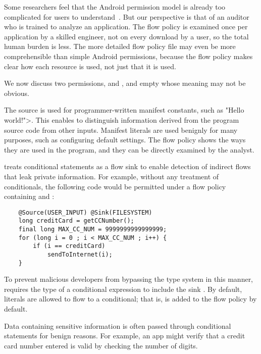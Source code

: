 Some researchers feel that the Android permission model is already too complicated for
users to understand~\cite{felt:2011:permissions}.  But our perspective is that of an auditor who
is trained to analyze an application.  The flow policy is examined once
per application by a skilled engineer, not on every download by a user, so
the total human burden is less.  The more detailed flow
policy file may even be more comprehensible than simple Android permissions,
because the flow policy makes clear how each resource is used, not just
that it is used.



We now discuss two permissions,  and , and empty  whose meaning may not be obvious.

The  source is used for programmer-written manifest
constants, such as \<"Hello world!">.
This enables \theFlowChecker to distinguish information derived
from the program source code from other inputs.
Manifest literals are used benignly for many 
purposes, such as configuring default settings.
The flow policy shows the ways they are used in the program, and they can
be directly examined by the analyst.


\TheFlowChecker treats conditional statements as a flow sink
to enable detection of indirect flows that leak private information.
For example, without any treatment of conditionals, the following code would
be permitted under a flow policy containing  and :

\begin{Verbatim}
    @Source(USER_INPUT) @Sink(FILESYSTEM)
    long creditCard = getCCNumber();
    final long MAX_CC_NUM = 9999999999999999;
    for (long i = 0 ; i < MAX_CC_NUM ; i++) {
        if (i == creditCard)
            sendToInternet(i);
    }
\end{Verbatim}

To prevent malicious developers from bypassing the type system in this manner,
\theFlowChecker requires the type of a
conditional expression to include the sink .
By default, literals are allowed to flow
to a conditional; that is,  is added to the flow policy by default.

Data containing sensitive information is often passed through conditional statements for benign reasons.  
For example, an app might verify that a credit card number entered is valid by checking the number of digits.

